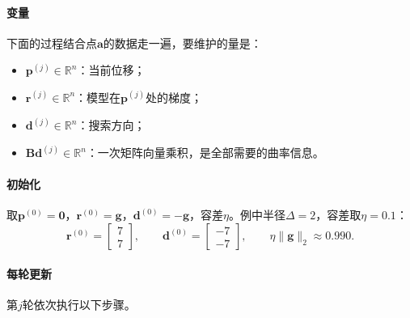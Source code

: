 \paragraph{变量}
下面的过程结合点$\bm{a}$的数据走一遍，要维护的量是：
\begin{itemize}
 \item $\bm{p}^{(j)}\in\mathbb{R}^n$：当前位移；
 \item $\bm{r}^{(j)}\in\mathbb{R}^n$：模型在$\bm{p}^{(j)}$处的梯度；
 \item $\bm{d}^{(j)}\in\mathbb{R}^n$：搜索方向；
 \item $\bm{B}\bm{d}^{(j)}\in\mathbb{R}^n$：一次矩阵向量乘积，是全部需要的曲率信息。
\end{itemize}

\paragraph{初始化}
取$\bm{p}^{(0)}=\bm{0}$，$\bm{r}^{(0)}=\bm{g}$，$\bm{d}^{(0)}=-\bm{g}$，容差$\eta$。例中半径$\Delta=2$，容差取$\eta=0.1$：
\[
 \bm{r}^{(0)}=\begin{bmatrix}7\\7\end{bmatrix},\qquad
 \bm{d}^{(0)}=\begin{bmatrix}-7\\-7\end{bmatrix},\qquad
 \eta\lVert\bm{g}\rVert_2\approx0.990.
\]

\paragraph{每轮更新}
第$j$轮依次执行以下步骤。

